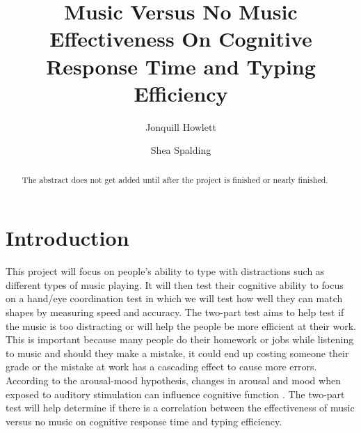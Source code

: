 \documentclass[manuscript, screen, review]{acmart} %
\begin{document}
\title{Music Versus No Music Effectiveness On Cognitive Response Time and Typing Efficiency}

\author{Jonquill Howlett}

\author{Shea Spalding}

\renewcommand{\shortauthors}{Howlett, Spalding}

\begin{abstract}
The abstract does not get added until after the project is finished or nearly finished.
\end{abstract}

\maketitle

\section{Introduction}
This project will focus on people's ability to type with distractions such as different types of music playing. 
It will then test their cognitive ability to focus on a hand/eye coordination test in which we will test how well they can match shapes by measuring speed and accuracy. 
The two-part test aims to help test if the music is too distracting or will help the people be more efficient at their work. 
This is important because many people do their homework or jobs while listening to music and should they make a mistake, it could end up costing someone their grade or the mistake at work has a cascading effect to cause more errors. According to the arousal-mood hypothesis, changes in arousal and mood when exposed to auditory stimulation can influence cognitive function \cite{Chee}.
The two-part test will help determine if there is a correlation between the effectiveness of music versus no music on cognitive response time and typing efficiency. 
\end{document}
